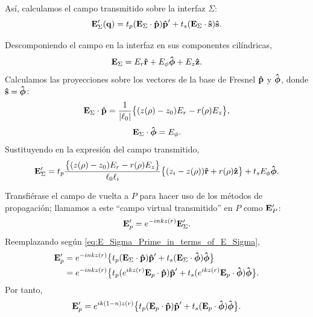Así, calculamos el campo transmitido sobre la interfaz $\Sigma$:
\begin{equation}
    \vb{E}'_{\Sigma}(\vb{q})
    =
    t_p (\vb{E}_{\Sigma} \cdot \bm{\hat{\mathbf{p}}}) \bm{\hat{\mathbf{p}}}'
    +
    t_s (\vb{E}_{\Sigma} \cdot \bm{\hat{\mathbf{s}}}) \bm{\hat{\mathbf{s}}}.
\label{eq:E_Sigma_Prime_in_terms_of_E_Sigma}
\end{equation}

Descomponiendo el campo en la interfaz en sus componentes cilíndricas,
\begin{equation}
    \vb{E}_{\Sigma}
    =
    E_r \bm{\hat{\mathbf{r}}}
    +
    E_{\phi} \bm{\hat{\mathbf{\phi}}}
    +
    E_z \bm{\hat{\mathbf{z}}}.
\end{equation}
Calculamos las proyecciones sobre los vectores de la base de Fresnel $\bm{\hat{\mathbf{p}}}$ y $\bm{\hat{\mathbf{\phi}}}$, donde $\bm{\hat{\mathbf{s}}}=\bm{\hat{\mathbf{\phi}}}$:
\begin{equation}
    \vb{E}_{\Sigma} \cdot \bm{\hat{\mathbf{p}}}
    =
    \frac{1}{|\ell_0|}
    \big\{
    (z(\rho) - z_0) E_r
    -
    r(\rho) E_z
    \big\},
\end{equation}
\begin{equation}
    \vb{E}_{\Sigma} \cdot \bm{\hat{\mathbf{\phi}}}
    =
    E_{\phi}.
\end{equation}
Sustituyendo en la expresión del campo transmitido,
\begin{equation}
    \vb{E}'_{\Sigma}
    =
    t_p
    \frac{
    \big\{ (z(\rho) - z_0) E_r - r(\rho) E_z \big\}
    }
    {
    \ell_0
    \ell_i
    }
    \big\{
    (z_i - z(\rho)) \bm{\hat{\mathbf{r}}}
    +
    r(\rho) \bm{\hat{\mathbf{z}}}
    \big\}
    +
    t_s E_{\phi} \bm{\hat{\mathbf{\phi}}}.
\end{equation}

Transfiérase el campo de vuelta a $P$ para hacer uso de los métodos de propagación; llamamos a este ``campo virtual transmitido'' en $P$ como $\vb{E}_P'$:
\begin{equation}
    \vb{E}_p'
    =
    e^{-inkz(r)} \vb{E}_{\Sigma}'.
\end{equation}
Reemplazando según \eqref{eq:E_Sigma_Prime_in_terms_of_E_Sigma},
\begin{align}
    \vb{E}_p'
    &=
    e^{-inkz(r)}
    \big\{
    t_p (\vb{E}_{\Sigma} \cdot \bm{\hat{\mathbf{p}}}) \bm{\hat{\mathbf{p}}}'
    +
    t_s (\vb{E}_{\Sigma} \cdot \bm{\hat{\mathbf{\phi}}}) \bm{\hat{\mathbf{\phi}}}
    \big\}
    \nonumber
    \\
    &=
    e^{-inkz(r)}
    \big\{
    t_p (e^{ikz(r)} \vb{E}_p \cdot \bm{\hat{\mathbf{p}}}) \bm{\hat{\mathbf{p}}}'
    +
    t_s (e^{ikz(r)} \vb{E}_p \cdot \bm{\hat{\mathbf{\phi}}}) \bm{\hat{\mathbf{\phi}}}
    \big\}.
\end{align}
Por tanto,
\begin{equation}
    \vb{E}_p'
    =
    e^{ik(1-n)z(r)}
    \big\{
    t_p (\vb{E}_p \cdot \bm{\hat{\mathbf{p}}}) \bm{\hat{\mathbf{p}}}'
    +
    t_s (\vb{E}_p \cdot \bm{\hat{\mathbf{\phi}}}) \bm{\hat{\mathbf{\phi}}}
    \big\}.
\end{equation}

